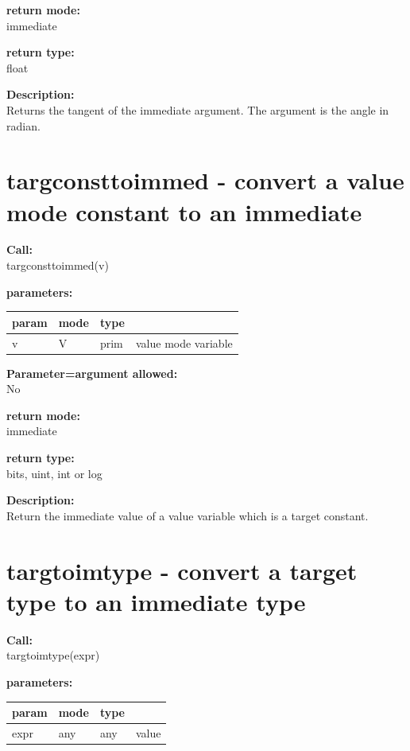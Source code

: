         {\bf return mode:} \\
        immediate

        {\bf return type:} \\
        float
        
        {\bf Description:} \\
        Returns the tangent of the immediate argument. The argument is the
        angle in radian.


    \section{targconsttoimmed - convert a value mode constant to an immediate}\label{sec:iftargconsttoimmed}
        
        {\bf Call:} \\
        targconsttoimmed(v)
        
        {\bf parameters:} \\
        \begin{tabular}{| l | l | l | l |}
        \hline
        param  & mode & type & \\
        \hline \hline
        v & V & prim & value mode variable \\ \hline
        \end{tabular}
        
        {\bf Parameter=argument allowed:} \\
        No
        
        {\bf return mode:} \\
        immediate

        {\bf return type:} \\
        bits, uint, int or log
        
        {\bf Description:} \\
        Return the immediate value of a value variable which is a target
        constant.



    \section{targtoimtype - convert a target type to an immediate type}\label{sec:iftargtoimtype}
        
        {\bf Call:} \\
        targtoimtype(expr)
        
        {\bf parameters:} \\
        \begin{tabular}{| l | l | l | l |}
        \hline
        param  & mode & type & \\
        \hline \hline
        expr & any & any & value \\ \hline
        \end{tabular}
        
